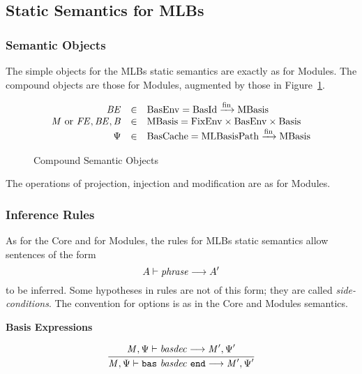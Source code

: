 \subsection{Static Semantics for MLBs}
%
\subsubsection{Semantic Objects}
The simple objects for the MLBs static semantics are exactly as for
Modules.  The compound objects are those for Modules, augmented by
those in Figure~\ref{fig:mlb:SS:CompoundObjects}.
\begin{figure}[h]
\begin{displaymath}
\begin{array}{rcl}
\mit{BE} & \in & \mrm{BasEnv} = \mrm{BasId} \xrightarrow{\mrm{fin}} \mrm{MBasis} \\
\mit{M} ~\mrm{or}~ \mit{FE},\mit{BE},\mit{B} & \in & 
\mrm{MBasis} = \mrm{FixEnv} \times \mrm{BasEnv} \times \mrm{Basis} \\
\Psi & \in & \mrm{BasCache} = \mrm{MLBasisPath} \xrightarrow{\mrm{fin}} \mrm{MBasis} 
\end{array}
\end{displaymath}
\caption{Compound Semantic Objects}\label{fig:mlb:SS:CompoundObjects}
\end{figure}
The operations of projection, injection and modification are as for
Modules.
%
\subsubsection{Inference Rules}
As for the Core and for Modules, the rules for MLBs static semantics
allow sentences of the form
\begin{displaymath}
A \vdash \mit{phrase} \longrightarrow A'
\end{displaymath}
to be inferred.  Some hypotheses in rules are not of this form; they
are called \emph{side-conditions}.  The convention for options is as
in the Core and Modules semantics.

\vspace{2\parsep}
{\large\noindent
\textbf{Basis Expressions} \hfill
{}
}\nopagebreak

\begin{equation}
\judge{
\mit{M}, \Psi \vdash \mit{basdec} \longrightarrow \mit{M}', \Psi'
}{
\mit{M}, \Psi \vdash \mtt{bas}~ \mit{basdec} ~\mtt{end} \longrightarrow \mit{M}', \Psi'
}
\end{equation}

